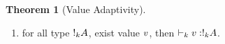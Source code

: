 \documentclass[a4paper,11pt]{article}
\theoremstyle{definition}
\newtheorem{thm}{Theorem}
\begin{document}
\begin{thm}[Value Adaptivity]
  \label{sub}
  \begin{enumerate} 
   \item for all type $!_{k} A$,  exist value $v$, then  $
     \empty \tvdash{ k} \valr : \bang{k} \ltype $.
  \end{enumerate}
\end{thm}

\end{document}

